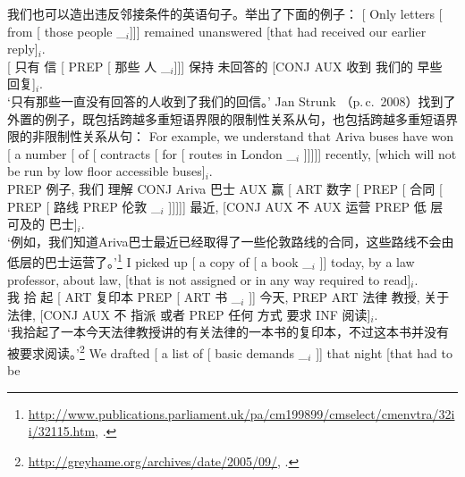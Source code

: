 \noindent
我们也可以造出违反邻接条件的英语句子。\citet[]{Uszkoreit90a}举出了下面的例子：
\ea
\gll {}[ Only letters [ from [ those people \_$_i$]]] remained
unanswered [that had received our earlier reply]$_i$.\\
{}[ 只有 信 [ PREP [ 那些 人 \_$_i$]]] 保持
未回答的 [CONJ AUX 收到 我们的 早些 回复]$_i$.\\
\glt `只有那些一直没有回答的人收到了我们的回信。'
\z
%
Jan Strunk （p.\,c.\, 2008）找到了外置的例子，既包括跨越多重短语界限的限制性关系从句，也包括跨越多重短语界限的非限制性关系从句：
\eal
\ex 
\gll For example, we understand that Ariva buses have won [ a number [ of [
      contracts [ for [ routes in London \_$_i$ ]]]]] recently, [which will not be run
by low floor accessible buses]$_i$.\\
PREP 例子, 我们 理解 CONJ Ariva 巴士 AUX 赢 [ ART 数字 [ PREP [
      合同 [ PREP [ 路线 PREP 伦敦 \_$_i$ ]]]]] 最近, [CONJ AUX 不 AUX 运营
PREP 低 层 可及的 巴士]$_i$.\\
\glt `例如，我们知道Ariva巴士最近已经取得了一些伦敦路线的合同，这些路线不会由低层的巴士运营了。'\footnote{
\url{http://www.publications.parliament.uk/pa/cm199899/cmselect/cmenvtra/32ii/32115.htm},
.
}
\ex 
\gll I picked up [ a copy of [ a book \_$_i$ ]] today, by a law
professor, about law, [that is not assigned or in any way required to read]$_i$.\\
我 拾 起 [ ART 复印本 PREP [ ART 书 \_$_i$ ]] 今天, PREP ART 法律
教授, 关于 法律, [CONJ AUX 不 指派 或者 PREP 任何 方式 要求 INF 阅读]$_i$.\\
\glt `我拾起了一本今天法律教授讲的有关法律的一本书的复印本，不过这本书并没有被要求阅读。'\footnote{
\url{http://greyhame.org/archives/date/2005/09/}, .
}
\ex 
\gll We drafted [ a list of [ basic demands \_$_i$ ]] that night [that had to be
